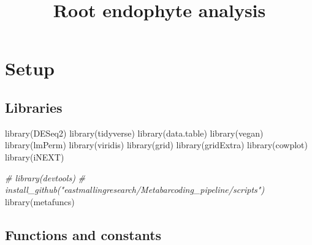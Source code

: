 \documentclass[
]{article}
\title{Root endophyte analysis}
\author{}
\date{\vspace{-2.5em}}
\newenvironment{Shaded}{\begin{snugshade}}{\end{snugshade}}
\newcommand{\CommentTok}[1]{\textcolor[rgb]{0.56,0.35,0.01}{\textit{#1}}}
\newcommand{\FunctionTok}[1]{\textcolor[rgb]{0.00,0.00,0.00}{#1}}
\newcommand{\NormalTok}[1]{#1}
\begin{document}
\maketitle

\hypertarget{setup}{%
\section{Setup}\label{setup}}

\hypertarget{libraries}{%
\subsection{Libraries}\label{libraries}}

\begin{Shaded}
\begin{Highlighting}[]
\FunctionTok{library}\NormalTok{(DESeq2)}
\FunctionTok{library}\NormalTok{(tidyverse)}
\FunctionTok{library}\NormalTok{(data.table)}
\FunctionTok{library}\NormalTok{(vegan)}
\FunctionTok{library}\NormalTok{(lmPerm)}
\FunctionTok{library}\NormalTok{(viridis)}
\FunctionTok{library}\NormalTok{(grid)}
\FunctionTok{library}\NormalTok{(gridExtra)}
\FunctionTok{library}\NormalTok{(cowplot)}
\FunctionTok{library}\NormalTok{(iNEXT)}

\CommentTok{\# library(devtools)}
\CommentTok{\# install\_github("eastmallingresearch/Metabarcoding\_pipeline/scripts")}
\FunctionTok{library}\NormalTok{(metafuncs)}
\end{Highlighting}
\end{Shaded}

\hypertarget{functions-and-constants}{%
\subsection{Functions and constants}\label{functions-and-constants}}
\end{document}

